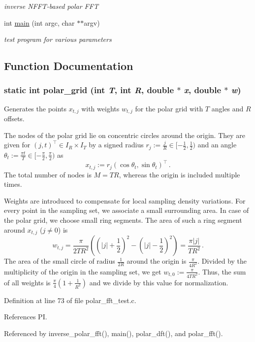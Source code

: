 \begin{CompactItemize}
\begin{CompactList}\small\item\em inverse NFFT-based polar FFT \item\end{CompactList}\item 
\hypertarget{group__applications__polarFFT__polar_g3c04138a5bfe5d72780bb7e82a18e627}{
int \hyperlink{group__applications__polarFFT__polar_g3c04138a5bfe5d72780bb7e82a18e627}{main} (int argc, char $\ast$$\ast$argv)}
\label{group__applications__polarFFT__polar_g3c04138a5bfe5d72780bb7e82a18e627}

\begin{CompactList}\small\item\em test program for various parameters \item\end{CompactList}\end{CompactItemize}


\subsection{Function Documentation}
\hypertarget{group__applications__polarFFT__polar_g307b67b4c00a1c756f140c7fa831cdae}{
\subsubsection{\setlength{\rightskip}{0pt plus 5cm}static int polar\_\-grid (int {\em T}, int {\em R}, double $\ast$ {\em x}, double $\ast$ {\em w})}}
\label{group__applications__polarFFT__polar_g307b67b4c00a1c756f140c7fa831cdae}


Generates the points $x_{t,j}$ with weights $w_{t,j}$ for the polar grid with $T$ angles and $R$ offsets. 

The nodes of the polar grid lie on concentric circles around the origin. They are given for $(j,t)^{\top}\in I_R\times I_T$ by a signed radius $r_j := \frac{j}{R} \in [-\frac{1}{2},\frac{1}{2})$ and an angle $\theta_t := \frac{\pi t}{T} \in [-\frac{\pi}{2},\frac{\pi}{2})$ as \[ x_{t,j} := r_j\left(\cos\theta_t, \sin\theta_t\right)^{\top}\,. \] The total number of nodes is $M=TR$, whereas the origin is included multiple times.

Weights are introduced to compensate for local sampling density variations. For every point in the sampling set, we associate a small surrounding area. In case of the polar grid, we choose small ring segments. The area of such a ring segment around $x_{t,j}$ ($j \ne 0$) is \[ w_{t,j} = \frac{\pi}{2TR^2}\left(\left(|j|+\frac{1}{2}\right)^2- \left(|j|-\frac{1}{2}\right)^2\right) = \frac{\pi |j| }{TR^2}\, . \] The area of the small circle of radius $\frac{1}{2R}$ around the origin is $\frac{\pi}{4R^2}$. Divided by the multiplicity of the origin in the sampling set, we get $w_{t,0} := \frac{\pi}{4TR^2}$. Thus, the sum of all weights is $\frac{\pi}{4}(1+\frac{1}{R^2})$ and we divide by this value for normalization. 

Definition at line 73 of file polar\_\-fft\_\-test.c.

References PI.

Referenced by inverse\_\-polar\_\-fft(), main(), polar\_\-dft(), and polar\_\-fft().